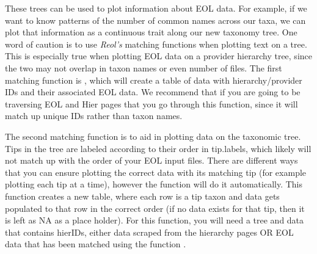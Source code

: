 \documentclass[12pt]{article}
\begin{document}
These trees can be used to plot information about EOL data. For example, if we want to know patterns of the number of common names across our taxa, we can plot that information as a continuous trait along our new taxonomy tree. One word of caution is to use \textit{Reol's} matching functions when plotting text on a tree.  This is especially true when plotting EOL data on a provider hierarchy tree, since the two may not overlap in taxon names or even number of files.  The first matching function is , which will create a table of data with hierarchy/provider IDs and their associated EOL data.  We recommend that if you are going to be traversing EOL and Hier pages that you go through this function, since it will match up unique IDs rather than taxon names.  

The second matching function is to aid in plotting data on the taxonomic tree.  Tips in the tree are labeled according to their order in tip.labels, which likely will not match up with the order of your EOL input files.  There are different ways that you can ensure plotting the correct data with its matching tip (for example plotting each tip at a time), however the function  will do it automatically.  This function creates a new table, where each row is a tip taxon and data gets populated to that row in the correct order (if no data exists for that tip, then it is left as NA as a place holder).  For this function, you will need a tree and data that contains hierIDs, either data scraped from the hierarchy pages OR EOL data that has been matched using the function .  
\end{document}
